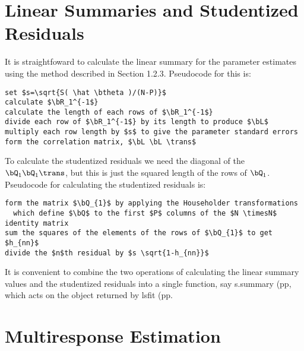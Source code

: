 {\section{Linear Summaries and Studentized Residuals}

It is straightfoward to calculate the linear summary for the parameter
estimates using the method described in Section 1.2.3.  Pseudocode for
this is:
\begin{verbatim}
set $s=\sqrt{S( \hat \btheta )/(N-P)}$
calculate $\bR_1^{-1$}
calculate the length of each rows of $\bR_1^{-1$}
divide each row of $\bR_1^{-1$} by its length to produce $\bL$
multiply each row length by $s$ to give the parameter standard errors
form the correlation matrix, $\bL \bL \trans$
\end{verbatim}

To calculate the studentized residuals we need the diagonal of the
$\bQ_1 \bQ_1 \trans$, but this is just the squared length of the
rows of $\bQ_{1}$.  Pseudocode for calculating the studentized
residuals is:
\begin{verbatim}
form the matrix $\bQ_{1}$ by applying the Householder transformations
  which define $\bQ$ to the first $P$ columns of the $N \timesN$ identity matrix
sum the squares of the elements of the rows of $\bQ_{1}$ to get $h_{nn}$
divide the $n$th residual by $s \sqrt{1-h_{nn}}$
\end{verbatim}

It is convenient to combine the two operations of calculating the
linear summary values and the studentized residuals into a single
function, say s.summary\rm%
(pp, which acts on the object
returned by lsfit\rm%
(pp.
\section{Multiresponse Estimation}

}
